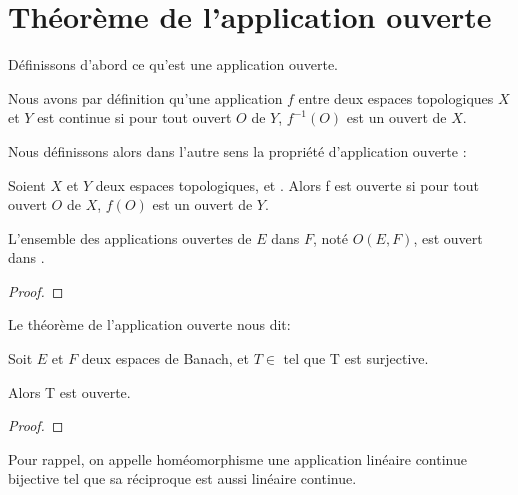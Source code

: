 \chapter{Théorème de l'application ouverte}

Définissons d'abord ce qu'est une application ouverte.

Nous avons par définition qu'une application $f$ entre deux espaces topologiques
$X$ et $Y$ est continue si pour tout ouvert $O$ de $Y$, $f^{-1}(O)$ est un
ouvert de $X$.

Nous définissons alors dans l'autre sens la propriété d'application ouverte :

\begin{definition}
	Soient $X$ et $Y$ deux espaces topologiques, et . Alors
	f est ouverte si pour tout ouvert $O$ de $X$, $f(O)$ est un ouvert de $Y$.
\end{definition}


%	

\begin{proposition}
	L'ensemble des applications ouvertes de $E$ dans $F$, noté $O(E, F)$, est
	ouvert dans .
\end{proposition}

\begin{proof}
	
\end{proof}

Le théorème de l'application ouverte nous dit:

\begin{theorem} 
\label{theorem_open_application}
	Soit $E$ et $F$ deux espaces de Banach, et $T \in$  tel
	que T est surjective.

	Alors T est ouverte.
\end{theorem}

\begin{proof}
	
\end{proof}

Pour rappel, on appelle homéomorphisme une application linéaire continue bijective
tel que sa réciproque est aussi linéaire continue.

